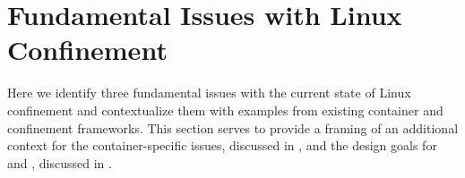 


\section{Fundamental Issues with Linux Confinement}%
\label{s:cp-issues}

Here we identify three fundamental issues with the current state of Linux confinement and
contextualize them with examples from existing container and confinement frameworks. This
section serves to provide a framing of an additional context for the container-specific
issues, discussed in , and the design goals for \bpfbox{} and
\bpfcontain{}, discussed in .


